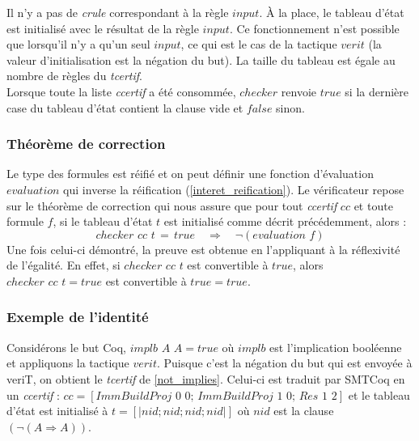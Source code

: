 \documentclass[11pt]{article}
\begin{document}
Il n'y a pas de \textit{crule} correspondant à la règle $input$. À la place, le tableau d'état est initialisé avec le résultat de la règle $input$. Ce fonctionnement n'est possible que lorsqu'il n'y a qu'un seul $input$, ce qui est le cas de la tactique $verit$ (la valeur d'initialisation est la négation du but). La taille du tableau est égale au nombre de règles du \textit{tcertif}. \\

Lorsque toute la liste \textit{ccertif} a été consommée, $checker$ renvoie $true$ si la dernière case du tableau d'état contient la clause vide et $false$ sinon.

\subsubsection{Théorème de correction}

Le type des formules est réifié et on peut définir une fonction d'évaluation $evaluation$ qui inverse la réification (\ref{interet_reification}). Le vérificateur repose sur le théorème de correction qui nous assure que pour tout \textit{ccertif} $cc$ et toute formule $f$, si le tableau d'état $t$ est initialisé comme décrit précédemment, alors : 
\[ checker  \,\, cc \,\, t \, = \, true \quad \Rightarrow \quad \neg (evaluation \, \, f) \]
Une fois celui-ci démontré, la preuve est obtenue en l'appliquant à la réflexivité de l'égalité. En effet, si $checker  \,\, cc\,\, t  $ est convertible à $true$, alors $checker  \,\, cc\,\, t = true $ est convertible à $true = true$.

\subsubsection{Exemple de l'identité}

Considérons le but Coq, $implb \,\, A \,\, A = true$ où $implb$ est l'implication booléenne et appliquons la tactique $verit$. Puisque c'est la négation du but qui est envoyée à veriT, on obtient le \textit{tcertif} de \ref{not_implies}. Celui-ci est traduit par SMTCoq en un \textit{ccertif} : 
$cc = [ImmBuildProj \,\, 0 \,\, 0; \,ImmBuildProj \,\, 1 \,\, 0; \, Res \,\, 1 \,\, 2] $ et le tableau d'état est initialisé à $t = [| nid; nid; nid; nid|]$ où $nid$ est la clause $( \neg (A \Rightarrow A))$. \\
\end{document}
